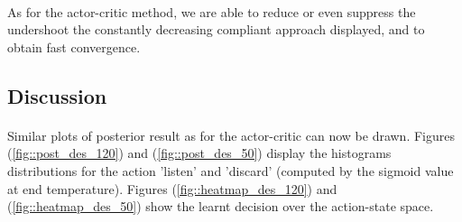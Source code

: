\documentclass[a4paper]{report}
\begin{document}
{{{{				\paragraph{} As for the actor-critic method, we are able to reduce or even suppress the undershoot the constantly decreasing compliant approach displayed, and to obtain fast convergence. 				
			}
			\subsection{Discussion}
			{
				\paragraph{} Similar plots of posterior result as for the actor-critic can now be drawn. Figures (\ref{fig::post_des_120}) and (\ref{fig::post_des_50}) display the histograms distributions for the action 'listen' and 'discard' (computed by the sigmoid value at end temperature). Figures (\ref{fig::heatmap_des_120}) and (\ref{fig::heatmap_des_50}) show the learnt decision over the action-state space. 
				
}}}}
\end{document}

